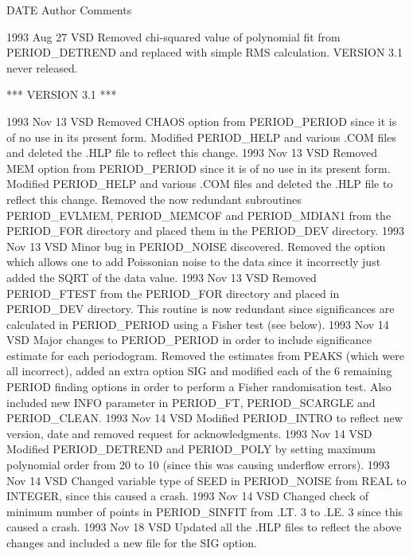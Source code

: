 \documentclass[twoside,11pt,noabs,nolof]{starlink}
\begin{document}
\begin{small}
\begin{terminalv}
   DATE       Author            Comments

1993 Aug 27    VSD       Removed chi-squared value of polynomial fit from
                         PERIOD_DETREND and replaced with simple RMS
                         calculation. VERSION 3.1 never released.

                         *** VERSION 3.1 ***

1993 Nov 13   VSD       Removed CHAOS option from PERIOD_PERIOD since it is
                        of no use in its present form. Modified PERIOD_HELP
                        and various .COM files and deleted the .HLP file to
                        reflect this change.
1993 Nov 13   VSD       Removed MEM option from PERIOD_PERIOD since it is
                        of no use in its present form. Modified PERIOD_HELP
                        and various .COM files and deleted the .HLP file to
                        reflect this change. Removed the now redundant
                        subroutines PERIOD_EVLMEM, PERIOD_MEMCOF and
                        PERIOD_MDIAN1 from the PERIOD_FOR directory and
                        placed them in the PERIOD_DEV directory.
1993 Nov 13   VSD       Minor bug in PERIOD_NOISE discovered. Removed the
                        option which allows one to add Poissonian noise
                        to the data since it incorrectly just added the
                        SQRT of the data value.
1993 Nov 13   VSD       Removed PERIOD_FTEST from the PERIOD_FOR directory
                        and placed in PERIOD_DEV directory. This routine
                        is now redundant since significances are calculated
                        in PERIOD_PERIOD using a Fisher test (see below).
1993 Nov 14   VSD       Major changes to PERIOD_PERIOD in order to include
                        significance estimate for each periodogram. Removed
                        the estimates from PEAKS (which were all incorrect),
                        added an extra option SIG and modified each of the
                        6 remaining PERIOD finding options in order to
                        perform a Fisher randomisation test. Also included
                        new INFO parameter in PERIOD_FT, PERIOD_SCARGLE
                        and PERIOD_CLEAN.
1993 Nov 14   VSD       Modified PERIOD_INTRO to reflect new version, date
                        and removed request for acknowledgments.
1993 Nov 14   VSD       Modified PERIOD_DETREND and PERIOD_POLY by setting
                        maximum polynomial order from 20 to 10 (since this
                        was causing underflow errors).
1993 Nov 14   VSD       Changed variable type of SEED in PERIOD_NOISE from
                        REAL to INTEGER, since this caused a crash.
1993 Nov 14   VSD       Changed check of minimum number of points in
                        PERIOD_SINFIT from .LT. 3 to .LE. 3 since this
                        caused a crash.
1993 Nov 18   VSD       Updated all the .HLP files to reflect the above
                        changes and included a new file for the SIG option.
\end{terminalv}
\end{small}
\end{document}
